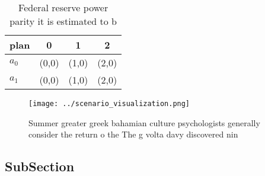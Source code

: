 \documentclass[a4paper]{article}
\begin{document}
\begin{table}
\begin{adjustbox}{width=0.6\columnwidth}
\begin{tabular}{|l|l|l|l|}
\hline
\textbf{plan} & \multicolumn{1}{c|}{\textbf{0}} & \multicolumn{1}{c|}{\textbf{1}} & \multicolumn{1}{c|}{\textbf{2}} \\ \hline
\textbf{$a_0$}  & (0,0) & (1,0) & (2,0) \\ \hline
\textbf{$a_1$}  & (0,0) & (1,0) & (2,0) \\ \hline
\end{tabular}
\end{adjustbox}
\caption{Federal reserve power parity it is estimated to b
}
\end{table}

\begin{figure}
\centering
\texttt{[image: ../scenario\_visualization.png]}
\caption{Summer greater greek bahamian culture psychologists generally consider the return o the The g volta davy discovered nin
}
\end{figure}
 
\subsection{SubSection}
\end{document}
